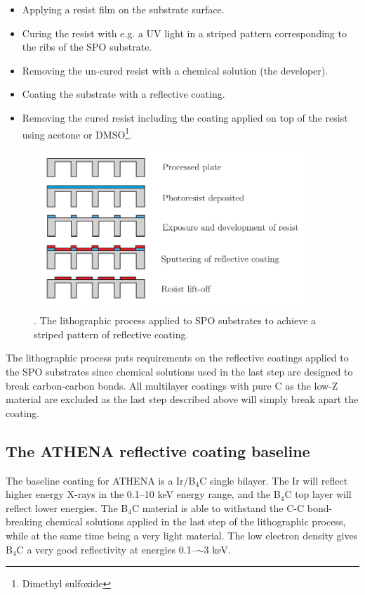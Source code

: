 \begin{itemize}
  \item Applying a resist film on the substrate surface.
  \item Curing the resist with e.g. a UV light in a striped pattern corresponding to the ribs of the SPO substrate.
  \item Removing the un-cured resist with a chemical solution (the developer).
  \item Coating the substrate with a reflective coating.
  \item Removing the cured resist including the coating applied on top of the resist using acetone or DMSO\footnote{Dimethyl sulfoxide}.
\end{itemize}

\begin{figure}[!h]
  \center
  \includegraphics[height=6cm]{figures/athena/litho_process.pdf}
\caption{\footnotesize. The lithographic process applied to SPO substrates to achieve a striped pattern of reflective coating.}\label{fig:litho_process}
\end{figure}

The lithographic process puts requirements on the reflective coatings applied to the SPO substrates since chemical solutions used in the last step are designed to break carbon-carbon bonds. All multilayer coatings with pure C as the low-Z material are excluded as the last step described above will simply break apart the coating.

\subsection{The ATHENA reflective coating baseline}
The baseline coating for ATHENA is a Ir/B$_4$C single bilayer. The Ir will reflect higher energy X-rays in the 0.1--10 keV energy range, and the B$_4$C top layer will reflect lower energies. The B$_4$C material is able to withstand the C-C bond-breaking chemical solutions applied in the last step of the lithographic process, while at the same time being a very light material. The low electron density gives B$_4$C a very good reflectivity at energies 0.1--$\sim$3 keV.

